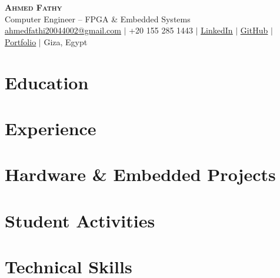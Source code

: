 \documentclass[letterpaper,10pt]{article} %
\newcommand{\resumeSubHeadingListStart}{\begin{itemize}[leftmargin=*]}
\newcommand{\resumeSubHeadingListEnd}{\end{itemize}}
\begin{document}


\begin{center}
    \textbf{\Huge \scshape Ahmed Fathy} \\ \vspace{1pt}
    \small Computer Engineer -- FPGA \& Embedded Systems \\
    \href{mailto:ahmedfathi20044002@gmail.com}{\underline{ahmedfathi20044002@gmail.com}} $|$ 
    +20 155 285 1443 $|$ 
    \href{https://www.linkedin.com/in/ahmedfathy-x1}{\underline{LinkedIn}} $|$ 
    \href{https://github.com/ahmedfathy0-0}{\underline{GitHub}} $|$ 
    \href{https://www.mrfathi.tech/}{\underline{Portfolio}} $|$ 
    Giza, Egypt
\end{center}


\section{Education}
  \resumeEducation

\section{Experience}
  \resumeExperienceHardware

\section{Hardware \& Embedded Projects}
  \resumeSubHeadingListStart
    \resumeProjectProcessor
    \vspace{4pt}
    \resumeProjectCNN
    \vspace{4pt}
    \resumeProjectAES
    \vspace{4pt}
    \resumeProjectTactic
    \vspace{4pt}
    \resumeProjectBrickBreakers
  \resumeSubHeadingListEnd

\section{Student Activities}
  \resumeSubHeadingListStart
    \resumeStudentActivities
  \resumeSubHeadingListEnd

\section{Technical Skills}
 \resumeSkillsHardware
\end{document}
